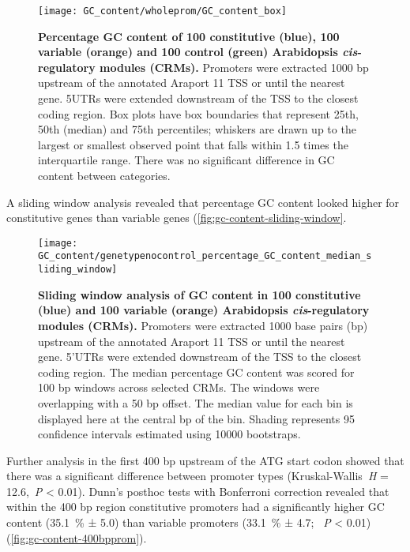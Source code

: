 \documentclass[../main.tex]{subfiles}
\begin{document}
\begin{figure}[hbt!]
	\begin{center}
		\capstart
		\texttt{[image: GC\_content/wholeprom/GC\_content\_box]}
		\caption{
			\textbf{Percentage GC content of 100 constitutive (blue), 100 variable (orange) and 100 control (green) Arabidopsis \textit{cis}\hyp{}regulatory modules (CRMs).}
			Promoters were extracted 1000 bp upstream of the annotated Araport 11 \autocite{chengAraport11CompleteReannotation2017} TSS or until the nearest gene.
			5UTRs were extended downstream of the TSS to the closest coding region.  Box plots have box boundaries that represent 25th, 50th (median) and 75th percentiles; whiskers are drawn up to the largest or smallest observed point that falls within 1.5 times the interquartile range.
			There was no significant difference in GC content between categories.
			\label{fig:gc-content-wholeprom}
		}
	\end{center}
\end{figure}

A sliding window analysis revealed that percentage GC content looked higher for constitutive genes than variable genes (\autoref{fig:gc-content-sliding-window}.
\begin{figure}[hbt!]
	\begin{center}
		\capstart
		\texttt{[image: GC\_content/genetypenocontrol\_percentage\_GC\_content\_median\_sliding\_window]}
		\caption{
			\textbf{Sliding window analysis of GC content in 100 constitutive (blue) and 100 variable (orange) Arabidopsis \textit{cis}\hyp{}regulatory modules (CRMs).}
			Promoters were extracted 1000 base pairs (bp) upstream of the annotated Araport 11 \autocite{chengAraport11CompleteReannotation2017} TSS or until the nearest gene.
			5'UTRs were extended downstream of the TSS to the closest coding region.
			The median percentage GC content was scored for 100 bp windows across selected CRMs.
			The windows were overlapping with a 50 bp offset.
			The median value for each bin is displayed here at the central bp of the bin.
			Shading represents 95 confidence intervals estimated using 10000 bootstraps.			
			\label{fig:gc-content-sliding-window}
		}
	\end{center}
\end{figure}

Further analysis in the first 400 bp upstream of the ATG start codon showed that there was a significant difference between promoter types (Kruskal\hyp{}Wallis~\textit{H} = 12.6,~\textit{P} \textless{} 0.01).
Dunn's posthoc tests with Bonferroni correction revealed that within the 400 bp region constitutive promoters had a significantly higher GC content (\SI{35.1}{\percent} ± 5.0) than variable promoters (\SI{33.1}{\percent} ± 4.7; ~\textit{P} \textless{} 0.01) (\autoref{fig:gc-content-400bpprom}).
\end{document}
